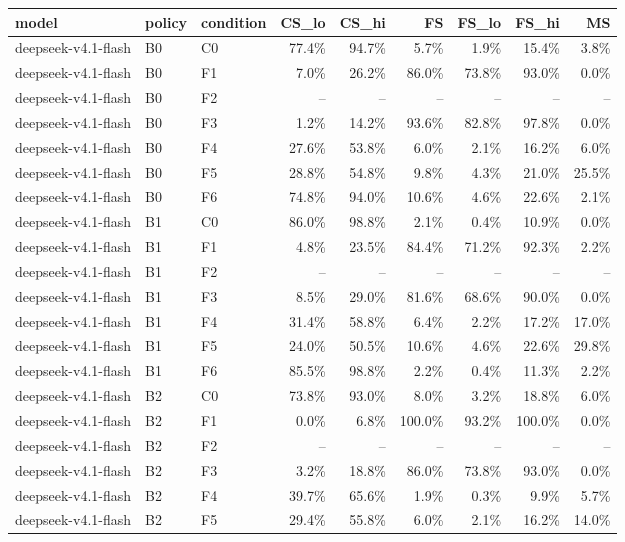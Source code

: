 \begin{tabular}{lllrrrrrr}
\toprule
model & policy & condition & CS\_lo & CS\_hi & FS & FS\_lo & FS\_hi & MS \\
\midrule
deepseek-v4.1-flash & B0 & C0 & 77.4\% & 94.7\% & 5.7\% & 1.9\% & 15.4\% & 3.8\% \\
deepseek-v4.1-flash & B0 & F1 & 7.0\% & 26.2\% & 86.0\% & 73.8\% & 93.0\% & 0.0\% \\
deepseek-v4.1-flash & B0 & F2 & -- & -- & -- & -- & -- & -- \\
deepseek-v4.1-flash & B0 & F3 & 1.2\% & 14.2\% & 93.6\% & 82.8\% & 97.8\% & 0.0\% \\
deepseek-v4.1-flash & B0 & F4 & 27.6\% & 53.8\% & 6.0\% & 2.1\% & 16.2\% & 6.0\% \\
deepseek-v4.1-flash & B0 & F5 & 28.8\% & 54.8\% & 9.8\% & 4.3\% & 21.0\% & 25.5\% \\
deepseek-v4.1-flash & B0 & F6 & 74.8\% & 94.0\% & 10.6\% & 4.6\% & 22.6\% & 2.1\% \\
deepseek-v4.1-flash & B1 & C0 & 86.0\% & 98.8\% & 2.1\% & 0.4\% & 10.9\% & 0.0\% \\
deepseek-v4.1-flash & B1 & F1 & 4.8\% & 23.5\% & 84.4\% & 71.2\% & 92.3\% & 2.2\% \\
deepseek-v4.1-flash & B1 & F2 & -- & -- & -- & -- & -- & -- \\
deepseek-v4.1-flash & B1 & F3 & 8.5\% & 29.0\% & 81.6\% & 68.6\% & 90.0\% & 0.0\% \\
deepseek-v4.1-flash & B1 & F4 & 31.4\% & 58.8\% & 6.4\% & 2.2\% & 17.2\% & 17.0\% \\
deepseek-v4.1-flash & B1 & F5 & 24.0\% & 50.5\% & 10.6\% & 4.6\% & 22.6\% & 29.8\% \\
deepseek-v4.1-flash & B1 & F6 & 85.5\% & 98.8\% & 2.2\% & 0.4\% & 11.3\% & 2.2\% \\
deepseek-v4.1-flash & B2 & C0 & 73.8\% & 93.0\% & 8.0\% & 3.2\% & 18.8\% & 6.0\% \\
deepseek-v4.1-flash & B2 & F1 & 0.0\% & 6.8\% & 100.0\% & 93.2\% & 100.0\% & 0.0\% \\
deepseek-v4.1-flash & B2 & F2 & -- & -- & -- & -- & -- & -- \\
deepseek-v4.1-flash & B2 & F3 & 3.2\% & 18.8\% & 86.0\% & 73.8\% & 93.0\% & 0.0\% \\
deepseek-v4.1-flash & B2 & F4 & 39.7\% & 65.6\% & 1.9\% & 0.3\% & 9.9\% & 5.7\% \\
deepseek-v4.1-flash & B2 & F5 & 29.4\% & 55.8\% & 6.0\% & 2.1\% & 16.2\% & 14.0\% \\

\end{tabular}
